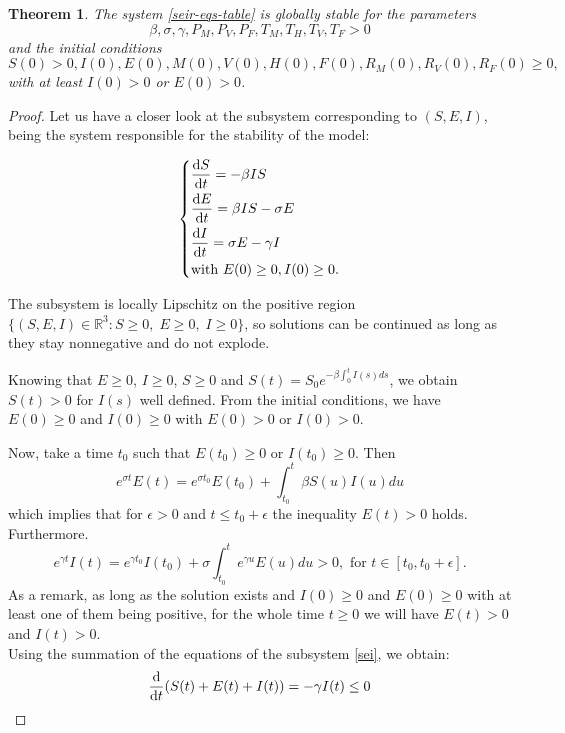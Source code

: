\documentclass[11pt]{article}
\newtheorem{theorem}{Theorem}
\begin{document}
\begin{theorem}
The system \ref{seir-eqs-table} is globally stable for the parameters 
\[
\beta, \sigma, \gamma, P_M, P_V, P_F, T_M, T_H, T_V, T_F >0
\]
and the initial conditions 
\[
S(0)>0, I(0), E(0), M(0), V(0), H(0),  F(0), R_M(0), R_V(0), R_F(0) \ge0,
\] with at least $I(0)>0$ or $E(0)>0$.  
\end{theorem}

\begin{proof}

Let us have a closer look at the subsystem corresponding to $(S,E,I)$, being the system responsible for the stability of the model:

\begin{equation} \label{sei}
  \left\{
    \begin{aligned}
      & \dv{S}{t} = - \beta I S \\
      & \dv{E}{t} = \beta I S - \sigma E\\
      & \dv{I}{t} = \sigma E - \gamma I\\
      &  \text{with }  E(0)\geq 0, I(0) \geq 0.
    \end{aligned}
  \right.
\end{equation}

The subsystem is locally Lipschitz on the positive region 
$\{(S,E,I)\in\mathbb R^3 : S\ge0,\;E\ge0,\;I\ge0\}
$, so solutions can be continued as long as they stay nonnegative and do not explode. 

Knowing that $E\geq 0$, $I\geq 0$, $S\geq 0$ and $S(t)=S_0 e^{-\beta \int_{0}^tI(s)ds}$, we obtain $S(t)>0$ for $I(s)$ well defined. 
From the initial conditions, we have $E(0)\geq 0$ and $I(0) \geq 0$ with $E(0)> 0$ or $I(0) > 0$.

Now, take a time $t_0$ such that  $E(t_0)\geq 0$ or $I(t_0)\ge 0$. Then
\[
e^{\sigma t}E(t)=e^{\sigma t_0}E(t_0)+\int_{t_0}^t\beta S(u) I(u)du
\]
which implies that for $\epsilon>0$ and $t\leq t_0+ \epsilon$ the inequality $E(t)>0$ holds. Furthermore. 
\[
e^{\gamma t}I(t)=e^{\gamma t_0}I(t_0)+\sigma \int_{t_0}^t e^ {\gamma u}E(u)du >0,\text{ for }t\in[t_0,t_0+\epsilon]. 
\]
As a remark, as long as the solution exists and $I(0)\ge0$ and $E(0)\ge0$ with at least one of them being positive, for the whole time $t\ge0$ we will have $E(t)>0$ and $I(t)>0$.\\  

Using the summation of the equations of the subsystem \ref{sei}, we obtain:
\begin{equation*}
    \dv{}{t} {(S(t)+E(t)+I(t))=-\gamma I(t)  \leq 0}
\end{equation*}


\end{proof}
\end{document}
